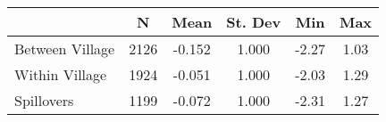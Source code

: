 \begin{tabular}{l*{5}{c}}\hline&\multicolumn{1}{c}{N}&\multicolumn{1}{c}{Mean}&\multicolumn{1}{c}{St. Dev}&\multicolumn{1}{c}{Min}&\multicolumn{1}{c}{Max}\\ \hline 
Between Village & 2126 & -0.152 & 1.000 & -2.27 & 1.03 \\
Within Village & 1924 & -0.051 & 1.000 & -2.03 & 1.29 \\
Spillovers & 1199 & -0.072 & 1.000 & -2.31 & 1.27 \\
\hline \end{tabular}
